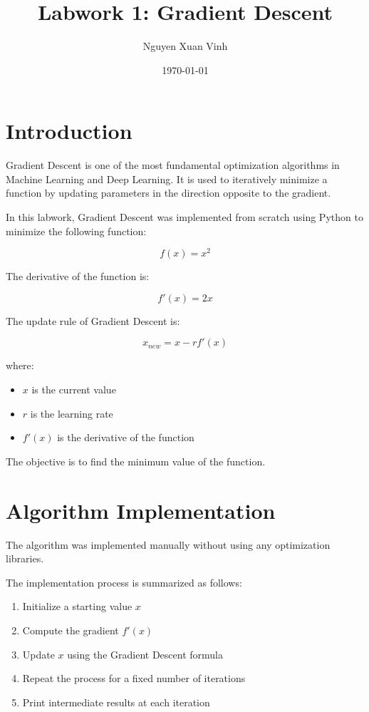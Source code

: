 \documentclass[12pt]{article}
\title{Labwork 1: Gradient Descent}
\author{Nguyen Xuan Vinh}
\date{\today}
\begin{document}
\maketitle

\section{Introduction}

Gradient Descent is one of the most fundamental optimization algorithms in Machine Learning and Deep Learning. 
It is used to iteratively minimize a function by updating parameters in the direction opposite to the gradient.

In this labwork, Gradient Descent was implemented from scratch using Python to minimize the following function:

\[
f(x) = x^2
\]

The derivative of the function is:

\[
f'(x) = 2x
\]

The update rule of Gradient Descent is:

\[
x_{new} = x - r f'(x)
\]

where:
\begin{itemize}
    \item \(x\) is the current value
    \item \(r\) is the learning rate
    \item \(f'(x)\) is the derivative of the function
\end{itemize}

The objective is to find the minimum value of the function.

\section{Algorithm Implementation}

The algorithm was implemented manually without using any optimization libraries.

The implementation process is summarized as follows:

\begin{enumerate}
    \item Initialize a starting value \(x\)
    \item Compute the gradient \(f'(x)\)
    \item Update \(x\) using the Gradient Descent formula
    \item Repeat the process for a fixed number of iterations
    \item Print intermediate results at each iteration
\end{enumerate}
\end{document}
